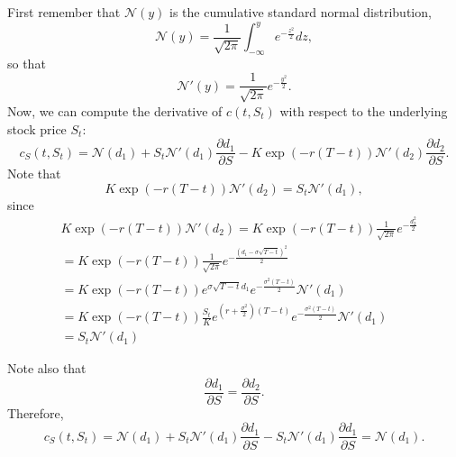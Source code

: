 \documentclass[handout,8pt]{beamer}
\begin{document}
\begin{frame}[allowframebreaks]{ }
\begin{enumerate}
\begin{enumerate}
        First remember that $\mathcal{N}(y)$ is the cumulative standard normal distribution,
        \begin{equation*}
            \mathcal{N}(y) = \frac{1}{\sqrt{2\pi}}\int_{-\infty}^y e^{-\frac{z^2}{2}} dz,
        \end{equation*}
        so that
        \begin{equation*}
            \mathcal{N}'(y) = \frac{1}{\sqrt{2\pi}} e^{-\frac{y^2}{2}}.
        \end{equation*}
        Now, we can compute the derivative of $c(t,S_t)$ with respect to the underlying stock price $S_t$:
        \begin{equation*}
            c_S(t,S_t) = \mathcal{N}(d_1) + S_t\mathcal{N}'(d_1)\frac{\partial d_1}{\partial S} - K \exp(-r(T-t))\mathcal{N}'(d_2) \frac{\partial d_2}{\partial S}.
        \end{equation*}
        Note that
        \begin{equation*}
            K \exp(-r(T-t))\mathcal{N}'(d_2) = S_t \mathcal{N}'(d_1),
        \end{equation*}
        since
        \begin{align*}
            &K \exp(-r(T-t))\mathcal{N}'(d_2) = K \exp(-r(T-t))\frac{1}{\sqrt{2\pi}} e^{-\frac{d^2_2}{2}}\\
            &= K \exp(-r(T-t))\frac{1}{\sqrt{2\pi}} e^{-\frac{(d_1-\sigma\sqrt{T-t})^2}{2}}\\
            &= K \exp(-r(T-t))e^{\sigma\sqrt{T-t}d_1}e^{-\frac{\sigma^2(T-t)}{2}}\mathcal{N}'(d_1)\\
            &= K \exp(-r(T-t))\frac{S_t}{K}e^{\left(r+\frac{\sigma^2}{2}\right)(T-t)}e^{-\frac{\sigma^2(T-t)}{2}}\mathcal{N}'(d_1)\\
            &= S_t \mathcal{N}'(d_1)
        \end{align*}
        
        \vspace*{1.5cm}
        
        Note also that
        \begin{equation*}
            \frac{\partial d_1}{\partial S} = \frac{\partial d_2}{\partial S}.
        \end{equation*}
        Therefore,
        \begin{equation*}
            c_S(t,S_t) = \mathcal{N}(d_1) + S_t\mathcal{N}'(d_1) \frac{\partial d_1}{\partial S} - S_t\mathcal{N}'(d_1) \frac{\partial d_1}{\partial S} = \mathcal{N}(d_1).
        \end{equation*}
        

\end{enumerate}
\end{enumerate}
\end{frame}
\end{document}
